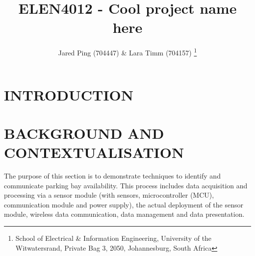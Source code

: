 \documentclass[10pt,twocolumn]{witseiepaper}
\begin{document}
	
	
\title{ELEN4012 - Cool project name here}
	
\author{Jared Ping (704447) \& Lara Timm (704157)
	\thanks{School of Electrical \& Information Engineering, University of the
			Witwatersrand, Private Bag 3, 2050, Johannesburg, South Africa}
}
	
\abstract{}
	
\keywords{}
	
\maketitle
\section{INTRODUCTION}




\section{BACKGROUND AND CONTEXTUALISATION}
	The purpose of this section is to demonstrate techniques to identify and communicate parking bay availability. This process includes data acquisition and processing via a sensor module (with sensors, microcontroller (MCU), communication module and power supply), the actual deployment of the sensor module, wireless data communication, data management and data presentation. 
\end{document}
